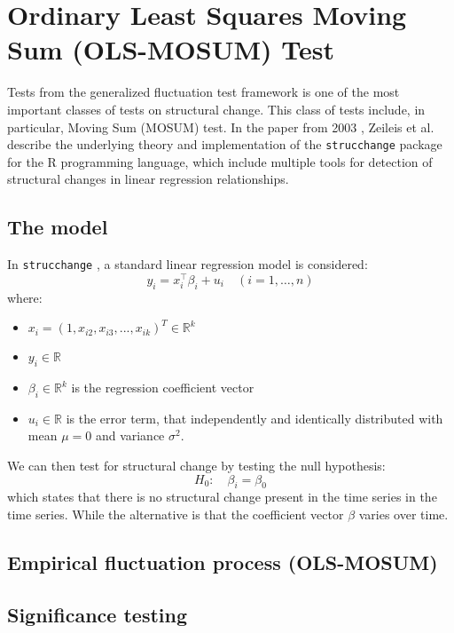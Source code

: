 \section{Ordinary Least Squares Moving Sum (OLS-MOSUM) Test}
\label{sec:mosum}

Tests from the generalized fluctuation test framework \cite{kuan_hornik}
is one of the most important classes of tests on structural change. This class
of tests include, in particular, Moving Sum (MOSUM) test. In the paper from
2003 \cite{strucchange}, Zeileis et al. describe the underlying theory and
implementation of the \texttt{strucchange}
package for the R programming language, which include multiple tools for
detection of structural changes in linear regression relationships.

\subsection{The model}
\label{sec:mosum}
In \texttt{strucchange} \cite{strucchange}, a standard linear regression model is considered:
\[
y_{i}=x_{i}^{\top} \beta_{i}+u_{i} \quad(i=1, \ldots, n)
\]
where:
\begin{itemize}
\item $x_i = (1,x_{i2}, x_{i3}, ..., x_{ik})^T \in \mathbb{R}^k$
\item $y_i \in \mathbb{R}$
\item $\beta_i \in \mathbb{R}^{k} $ is the
  regression coefficient vector
\item $u_i \in \mathbb{R}$ is the error term, that independently and identically
  distributed with mean $\mu = 0$ and variance $\sigma^2$.
\end{itemize}
We can then test for structural change by testing the null hypothesis:
\[
H_0:\quad \beta_i = \beta_0
\]
which states that there is no structural change present in the time series in
the time series. While the alternative is that the coefficient vector $\beta$
varies over time.


\subsection{Empirical fluctuation process (OLS-MOSUM)}
\subsection{Significance testing}
